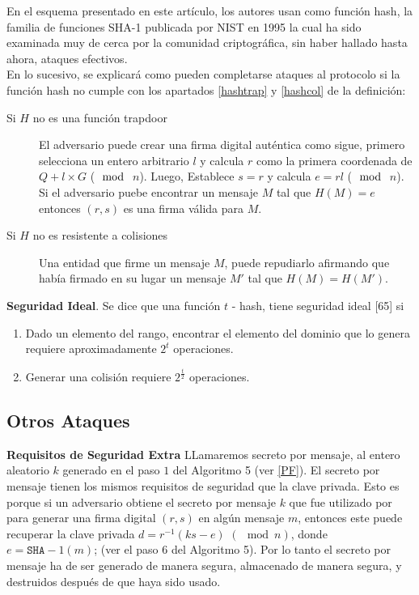 \documentclass[11pt]{article}
\numberwithin{equation}{section} %
\numberwithin{figure}{section} %
\numberwithin{table}{section} %
\begin{document}
		En el esquema presentado en este artículo, los autores usan como función hash, la familia de funciones SHA-1 publicada por NIST en 1995 la cual ha sido examinada muy de cerca por la comunidad criptográfica, sin haber hallado hasta ahora, ataques efectivos.\\

		En lo sucesivo, se explicará como pueden completarse ataques al protocolo si la función hash no cumple con los apartados \ref{hashtrap} y \ref{hashcol} de la definición:

		\begin{description}
			\item[Si $H$ no es una función trapdoor] El adversario puede crear una firma digital auténtica como sigue, primero selecciona un entero arbitrario $l$ y calcula $r$ como la primera coordenada de $\mathit{Q}+l\times G$ ($\mod$ $n$). Luego, Establece $s=r$ y calcula $e=rl$ ($\mod$ $n$). Si el adversario puebe encontrar un mensaje $M$ tal que $H(M)=e$ entonces $(r,s)$ es una firma válida para $M$.

			\item[Si $H$ no es resistente a colisiones] Una entidad que firme un mensaje $M$, puede repudiarlo afirmando que había firmado en su lugar un mensaje $M\prime$ tal que $H(M)=H(M\prime)$.
		\end{description}

		\textbf{Seguridad Ideal}. Se dice que una función $t$ - hash, tiene seguridad ideal [65] si 
			\begin{enumerate}
				\item Dado un elemento del rango, encontrar el elemento del dominio que lo genera requiere aproximadamente $2^t$ operaciones.
				\item Generar una colisión requiere $2^{\frac{t}{2}}$ operaciones.
			\end{enumerate}

	\subsection{Otros Ataques}

		\textbf{Requisitos de Seguridad Extra} LLamaremos secreto por mensaje, al entero aleatorio $k$ generado en el paso $1$ del Algoritmo 5 (ver \ref{PF}). El secreto por mensaje tienen los mismos requisitos de seguridad que la clave privada. Esto es porque si un adversario obtiene el secreto por mensaje $k$ que fue utilizado por para generar una firma digital $(r,s)$ en algún mensaje $m$, entonces este puede recuperar la clave privada $d=r^{-1}(ks-e)$ $(\mod n)$, donde $e=\mathtt{SHA-}1(m)$; (ver el paso 6 del Algoritmo 5). Por lo tanto el secreto por mensaje ha de ser generado de manera segura, almacenado de manera segura, y destruidos después de que haya sido usado.
\end{document}

